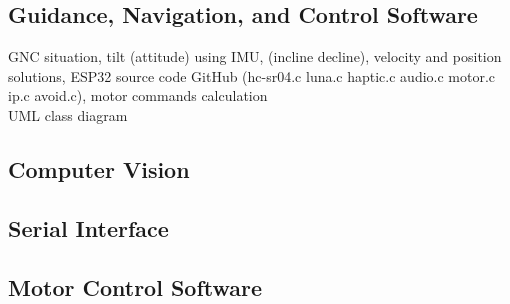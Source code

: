 \subsection{Guidance, Navigation, and Control Software}
\noindent GNC situation, tilt (attitude) using IMU, (incline decline), velocity and position solutions, ESP32 source code GitHub (hc-sr04.c luna.c haptic.c audio.c motor.c ip.c avoid.c), motor commands calculation\\

\noindent UML class diagram\\

\subsection{Computer Vision}

\subsection{Serial Interface}

\subsection{Motor Control Software}